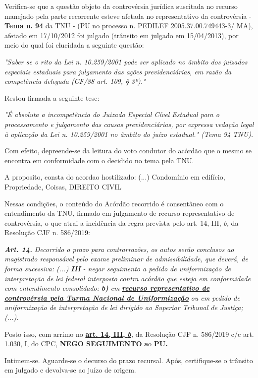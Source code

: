 \documentclass[12pt]{article}
\begin{document}
\justifying
\noindent Verifica-se que a questão objeto da controvérsia jurídica suscitada no recurso manejado pela parte recorrente esteve afetada no representativo da controvérsia - \textbf{Tema n. }\textbf{94} da TNU - (PU no processo n. PEDILEF 2005.37.00.749443-3/ MA),  afetado em 17/10/2012 foi julgado (trânsito em julgado em 15/04/2013), por meio do qual foi elucidada a seguinte questão:

\noindent \textit{"Saber se o rito da Lei n. 10.259/2001 pode ser aplicado no âmbito dos juizados especiais estaduais para julgamento das ações previdenciárias, em razão da competência delegada (CF/88 art. 109, § 3º)."}

\noindent Restou firmada a seguinte tese:

\noindent \textit{"É absoluta a incompetência do Juizado Especial Cível Estadual para o processamento e julgamento das causas previdenciárias, por expressa vedação legal à aplicação da Lei n. 10.259/2001 no âmbito do juízo estadual." (Tema 94 TNU).}

\noindent Com efeito, depreende-se da leitura do voto condutor do acórdão que o mesmo se encontra em conformidade com o decidido no  tema pela TNU.

\noindent A proposito, consta do acordao hostilizado: (...) Condomínio em edifício, Propriedade, Coisas, DIREITO CIVIL

\noindent Nessas condições, o conteúdo do Acórdão recorrido é consentâneo com o entendimento da TNU, firmado em julgamento de recurso representativo de controvérsia, o que atrai a incidência da regra prevista pelo art. 14, III, \textit{b,} da Resolução CJF n. 586/2019:

\noindent \textit{\textbf{Art. 14.}}\textit{ Decorrido o prazo para contrarrazões, os autos serão conclusos ao magistrado responsável pelo exame preliminar de admissibilidade, que deverá, de forma sucessiva: (...) }\textit{\textbf{III }}\textit{- negar seguimento a pedido de uniformização de interpretação de lei federal interposto contra acórdão que esteja em conformidade com entendimento consolidado: }\textit{\textbf{b)}}\textit{ em }\uline{\textit{\textbf{recurso representativo de controvérsia pela Turma Nacional de Uniformização}}}\textit{ ou em pedido de uniformização de interpretação de lei dirigido ao Superior Tribunal de Justiça;(...).}

\noindent Posto isso, com arrimo no \uline{\textbf{art. 14, III, }}\uline{\textit{\textbf{b}}}\textit{,} da Resolução CJF n. 586/2019 c/c art. 1.030, I, do CPC, \textbf{NEGO SEGUIMENTO }\textbf{a}o\textbf{ PU}\textbf{.}

\noindent Intimem-se. Aguarde-se o decurso do prazo recursal. Após, certifique-se o trânsito em julgado e devolva-se ao juízo de origem.
\end{document}
